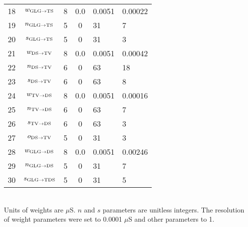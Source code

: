 \begin{table}[tp]
\begin{tabularx}{\textwidth}{lcccXX}
18 & $w_{{\rm GLG}\to {\rm TS}} $  &      8      & 0.0 &       0.0051        & 0.00022 \\ %
19 & $n_{{\rm GLG}\to {\rm TS}} $  &      5      &  0  &         31          & 7 \\ %
20 & $s_{{\rm GLG}\to {\rm TS}} $  &      5      &  0  &         31          & 3 \\   %
21 &  $w_{{\rm DS}\to {\rm TV}} $  &      8      & 0.0 &       0.0051        & 0.00042 \\ %
22 &  $n_{{\rm DS}\to {\rm TV}} $  &      6      &  0  &         63          & 18 \\ %
23 &  $s_{{\rm DS}\to {\rm TV}} $  &      6      &  0  &         63          & 8 \\   %
24 &  $w_{{\rm TV}\to {\rm DS}} $  &      8      & 0.0 &       0.0051        & 0.00016 \\ %
25 &  $n_{{\rm TV}\to {\rm DS}} $  &      6      &  0  &         63          & 7   \\ %
26 &  $s_{{\rm TV}\to {\rm DS}} $  &      6      &  0  &         63          & 3 \\   %
27 &  $o_{{\rm DS}\to {\rm TV}} $  &      5      &  0  &         31          & 3 \\ %
28 & $w_{{\rm GLG}\to {\rm DS}} $  &      8      & 0.0 &       0.0051        & 0.00246 \\   %
29 & $n_{{\rm GLG}\to {\rm DS}} $  &      5      &  0  &         31          & 7 \\ %
30 & $s_{{\rm GLG}\to {\rm TDS}} $ &      5      &  0  &         31          & 5 \\[0.5ex]\hline
\end{tabularx}\\
 \footnotesize{Units of weights are $\mu$S. $n$ and $s$ parameters are
   unitless integers. The resolution of weight parameters were set to
   0.0001 $\mu$S and other parameters to 1.}
\end{table}


